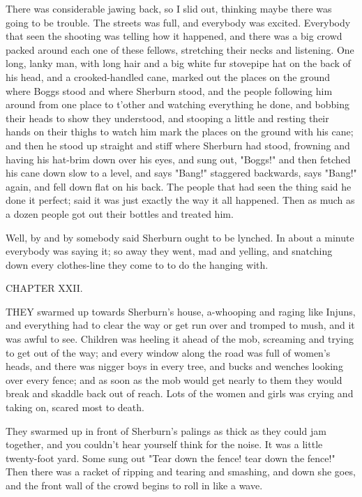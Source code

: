 There was considerable jawing back, so I slid out, thinking maybe there
was going to be trouble.  The streets was full, and everybody was
excited. Everybody that seen the shooting was telling how it happened,
and there was a big crowd packed around each one of these fellows,
stretching their necks and listening.  One long, lanky man, with long
hair and a big white fur stovepipe hat on the back of his head, and a
crooked-handled cane, marked out the places on the ground where Boggs
stood and where Sherburn stood, and the people following him around from
one place to t'other and watching everything he done, and bobbing their
heads to show they understood, and stooping a little and resting their
hands on their thighs to watch him mark the places on the ground with his
cane; and then he stood up straight and stiff where Sherburn had stood,
frowning and having his hat-brim down over his eyes, and sung out,
"Boggs!" and then fetched his cane down slow to a level, and says "Bang!"
staggered backwards, says "Bang!" again, and fell down flat on his back.
The people that had seen the thing said he done it perfect; said it was
just exactly the way it all happened.  Then as much as a dozen people got
out their bottles and treated him.

Well, by and by somebody said Sherburn ought to be lynched.  In about a
minute everybody was saying it; so away they went, mad and yelling, and
snatching down every clothes-line they come to to do the hanging with.




CHAPTER XXII.

THEY swarmed up towards Sherburn's house, a-whooping and raging like
Injuns, and everything had to clear the way or get run over and tromped
to mush, and it was awful to see.  Children was heeling it ahead of the
mob, screaming and trying to get out of the way; and every window along
the road was full of women's heads, and there was nigger boys in every
tree, and bucks and wenches looking over every fence; and as soon as the
mob would get nearly to them they would break and skaddle back out of
reach.  Lots of the women and girls was crying and taking on, scared most
to death.

They swarmed up in front of Sherburn's palings as thick as they could jam
together, and you couldn't hear yourself think for the noise.  It was a
little twenty-foot yard.  Some sung out "Tear down the fence! tear down
the fence!"  Then there was a racket of ripping and tearing and smashing,
and down she goes, and the front wall of the crowd begins to roll in like
a wave.

